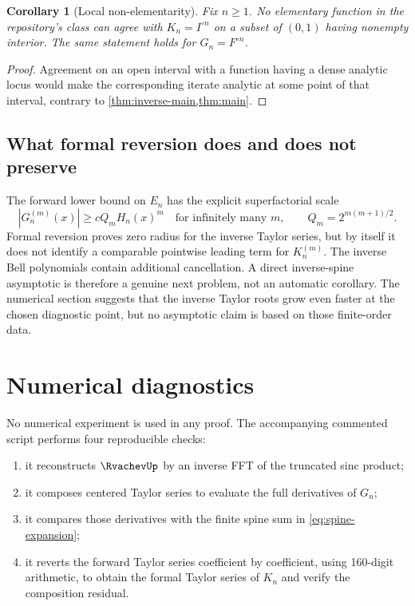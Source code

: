 \documentclass[11pt,oneside]{article}
\newtheorem{corollary}[theorem]{Corollary}
\theoremstyle{definition}
\theoremstyle{remark}
\newcommand{\comp}{\mathbin{\circ}}
\begin{document}
\begin{corollary}[Local non-elementarity]
\label{cor:non-elementary}
Fix $n\geq1$.  No elementary function in the repository's class can agree with
$K_n=I^{\comp n}$ on a subset of $(0,1)$ having nonempty interior.  The same statement
holds for $G_n=F^{\comp n}$.
\end{corollary}

\begin{proof}
Agreement on an open interval with a function having a dense analytic locus would make
the corresponding iterate analytic at some point of that interval, contrary to
\cref{thm:inverse-main,thm:main}.
\end{proof}

\subsection{What formal reversion does and does not preserve}

The forward lower bound on $E_n$ has the explicit superfactorial scale
\begin{equation}
 |G_n^{(m)}(x)|\geq cQ_mH_n(x)^m
 \quad\text{for infinitely many }m,
 \qquad Q_m=2^{m(m+1)/2}.
 \label{eq:forward-growth-restated}
\end{equation}
Formal reversion proves zero radius for the inverse Taylor series, but by itself it does
not identify a comparable pointwise leading term for $K_n^{(m)}$.  The inverse Bell
polynomials contain additional cancellation.  A direct inverse-spine asymptotic is
therefore a genuine next problem, not an automatic corollary.  The numerical section
suggests that the inverse Taylor roots grow even faster at the chosen diagnostic point,
but no asymptotic claim is based on those finite-order data.

\section{Numerical diagnostics}
\label{sec:numerics}

No numerical experiment is used in any proof.  The accompanying commented script
 performs four reproducible checks:
\begin{enumerate}[label=(\roman*)]
 \item it reconstructs $\RvachevUp$ by an inverse FFT of the truncated sinc product;
 \item it composes centered Taylor series to evaluate the full derivatives of $G_n$;
 \item it compares those derivatives with the finite spine sum in
 \eqref{eq:spine-expansion};
 \item it reverts the forward Taylor series coefficient by coefficient, using 160-digit
 arithmetic, to obtain the formal Taylor series of $K_n$ and verify the composition
 residual.
\end{enumerate}
\end{document}
